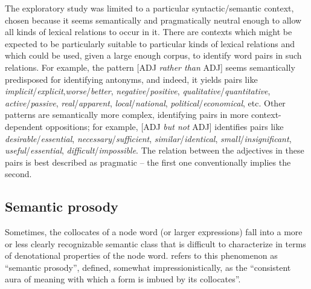 The exploratory  study was limited to a particular syntactic\slash semantic  context, chosen because it seems semantically and pragmatically  neutral enough to allow all kinds of lexical relations to occur in it. There are contexts which might be expected to be particularly suitable to particular kinds of lexical relations and which could be used, given a large  enough corpus, to identify word pairs in such relations. For example, the pattern [ADJ \textit{rather than} ADJ] seems semantically predisposed for identifying antonyms,  and indeed, it yields pairs like \textit{implicit}\slash \textit{explicit},\linebreak \textit{worse}\slash \textit{better}, \textit{negative}\slash \textit{positive}, \textit{qualitative}\slash \textit{quantitative}, \textit{active}\slash\textit{passive}, \textit{real}\slash\textit{appar\-ent}, \textit{local}\slash \textit{national}, \textit{political}\slash \textit{economical}, etc. Other patterns are semantically more complex, identifying pairs in more context\hyp{}dependent oppositions; for example, [ADJ \textit{but not} ADJ] identifies pairs like \textit{desirable}\slash \textit{essential}, \textit{necessary}\slash \textit{sufficient}, \textit{similar}\slash \textit{identical}, \textit{small}\slash \textit{insignificant}, \textit{useful}\slash \textit{essential}, \textit{difficult}\slash \textit{impossible}. The relation between the adjectives  in these pairs is best described as pragmatic  -- the first one conventionally  implies the second.

\subsection{Semantic prosody}
\label{sec:semanticprosody}

Sometimes, the collocates  of a node word (or larger expressions) fall into a more or less clearly recognizable semantic  class that is difficult to characterize in terms of denotational properties of the node word. \citet[157]{louw_irony_1993} refers to this phenomenon as ``semantic prosody'', defined, somewhat impressionistically, as the ``consistent aura of meaning with which a form is imbued by its  collocates''.

